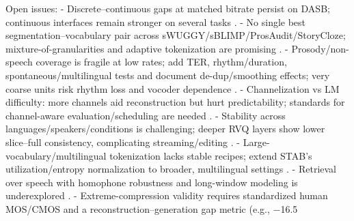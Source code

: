 \documentclass{article}
\begin{document}
Open issues:
- Discrete--continuous gaps at matched bitrate persist on DASB; continuous interfaces remain stronger on several tasks \cite{mousavi2024dasbdiscreteaudiospeechbenchmark}.
- No single best segmentation--vocabulary pair across sWUGGY/sBLIMP/ProsAudit/StoryCloze; mixture-of-granularities and adaptive tokenization are promising \cite{kando2025exploringeffectsegmentationvocabularysiz}.
- Prosody/non-speech coverage is fragile at low rates; add TER, rhythm/duration, spontaneous/multilingual tests and document de-dup/smoothing effects; very coarse units risk rhythm loss and vocoder dependence \cite{onda2025benchmarkingprosodyencodingdiscretespeec,baade2024syllablelmlearningcoarsesemanticunitsspe}.
- Channelization vs LM difficulty: more channels aid reconstruction but hurt predictability; standards for channel-aware evaluation/scheduling are needed \cite{ji2025languagecodecbridgingdiscreterepresentat}.
- Stability across languages/speakers/conditions is challenging; deeper RVQ layers show lower slice--full consistency, complicating streaming/editing \cite{vashishth2024stabspeechtokenizerassessmentbenchmark,maimon2025salmonsuiteacousticlanguagemodelevaluati,cui2025voxevalbenchmarkingknowledgeunderstandin,entry2025indicsuperbspeechprocessinguniversalperf}.
- Large-vocabulary/multilingual tokenization lacks stable recipes; extend STAB's utilization/entropy normalization to broader, multilingual settings \cite{vashishth2024stabspeechtokenizerassessmentbenchmark}.
- Retrieval over speech with homophone robustness and long-window modeling is underexplored \cite{min2025speechretrievalaugmentedgenerationwithou,onda2025benchmarkingprosodyencodingdiscretespeec,maimon2025salmonsuiteacousticlanguagemodelevaluati,entry2025indicsuperbspeechprocessinguniversalperf}.
- Extreme-compression validity requires standardized human MOS/CMOS and a reconstruction--generation gap metric (e.g., $-$16.5%
\end{document}
